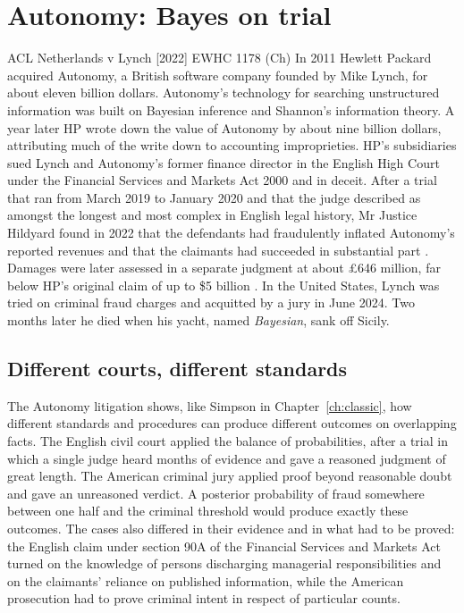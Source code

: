 \section{Autonomy: Bayes on trial}

\begin{casebox}{ACL Netherlands v Lynch [2022] EWHC 1178 (Ch)}
In 2011 Hewlett Packard acquired Autonomy, a British software company founded by Mike Lynch, for about eleven billion dollars. Autonomy's technology for searching unstructured information was built on Bayesian inference and Shannon's information theory. A year later HP wrote down the value of Autonomy by about nine billion dollars, attributing much of the write down to accounting improprieties. HP's subsidiaries sued Lynch and Autonomy's former finance director in the English High Court under the Financial Services and Markets Act 2000 and in deceit. After a trial that ran from March 2019 to January 2020 and that the judge described as amongst the longest and most complex in English legal history, Mr Justice Hildyard found in 2022 that the defendants had fraudulently inflated Autonomy's reported revenues and that the claimants had succeeded in substantial part \citep{autonomy2022}. Damages were later assessed in a separate judgment at about \pounds 646 million, far below HP's original claim of up to \$5 billion \citep{autonomy2025}. In the United States, Lynch was tried on criminal fraud charges and acquitted by a jury in June 2024. Two months later he died when his yacht, named \emph{Bayesian}, sank off Sicily.
\end{casebox}

\subsection{Different courts, different standards}

The Autonomy litigation shows, like Simpson in Chapter~\ref{ch:classic}, how different standards and procedures can produce different outcomes on overlapping facts. The English civil court applied the balance of probabilities, after a trial in which a single judge heard months of evidence and gave a reasoned judgment of great length. The American criminal jury applied proof beyond reasonable doubt and gave an unreasoned verdict. A posterior probability of fraud somewhere between one half and the criminal threshold would produce exactly these outcomes. The cases also differed in their evidence and in what had to be proved: the English claim under section 90A of the Financial Services and Markets Act turned on the knowledge of persons discharging managerial responsibilities and on the claimants' reliance on published information, while the American prosecution had to prove criminal intent in respect of particular counts.

